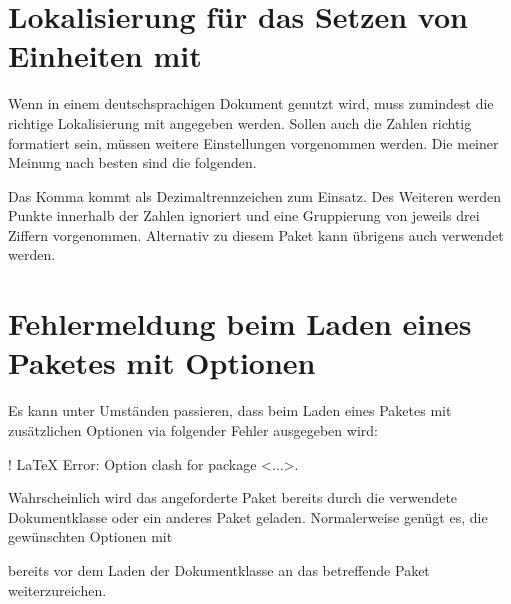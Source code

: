\section{%
  Lokalisierung für das Setzen von Einheiten mit %
  \label{sec:tips:siunitx}%
}
%
Wenn  in einem deutschsprachigen Dokument genutzt wird, muss 
zumindest die richtige Lokalisierung mit  
angegeben werden. Sollen auch die Zahlen richtig formatiert sein, müssen 
weitere Einstellungen vorgenommen werden. Die meiner Meinung nach besten sind 
die folgenden.
%
\begin{quoting}
\begin{Code}
\end{Code}
\end{quoting}
%
Das Komma kommt als Dezimaltrennzeichen zum Einsatz. Des Weiteren werden Punkte 
innerhalb der Zahlen ignoriert und eine Gruppierung von jeweils drei Ziffern 
vorgenommen. Alternativ zu diesem Paket kann übrigens auch  
verwendet werden.



\section{%
  Fehlermeldung beim Laden eines Paketes mit Optionen%
  \label{sec:tips:options}%
}
%
%
%
Es kann unter Umständen passieren, dass beim Laden eines Paketes mit 
zusätzlichen Optionen via 
folgender Fehler ausgegeben wird:
%
\begin{quoting}
\begin{Code}[escapechar=§]
! LaTeX Error: Option clash for package <...>.
\end{Code}
\end{quoting}
%
Wahrscheinlich wird das angeforderte Paket bereits durch die verwendete 
Dokumentklasse oder ein anderes Paket geladen. Normalerweise genügt es, die 
gewünschten Optionen mit
\begin{quoting}
\newline%
%
\end{quoting}
bereits vor dem Laden der Dokumentklasse an das betreffende Paket 
weiterzureichen.



